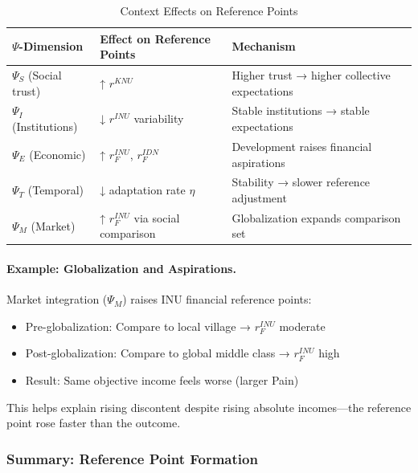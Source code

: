 \begin{table}[htbp]
\centering
\caption{Context Effects on Reference Points}
\label{tab:context-reference}
\renewcommand{\arraystretch}{1.3}
\begin{tabular}{@{}lll@{}}
\toprule
\textbf{$\Psi$-Dimension} & \textbf{Effect on Reference Points} & \textbf{Mechanism} \\
\midrule
$\Psi_S$ (Social trust) & ↑ $r^{KNU}$ & Higher trust → higher collective expectations \\
$\Psi_I$ (Institutions) & ↓ $r^{INU}$ variability & Stable institutions → stable expectations \\
$\Psi_E$ (Economic) & ↑ $r^{INU}_F$, $r^{IDN}_F$ & Development raises financial aspirations \\
$\Psi_T$ (Temporal) & ↓ adaptation rate $\eta$ & Stability → slower reference adjustment \\
$\Psi_M$ (Market) & ↑ $r^{INU}_F$ via social comparison & Globalization expands comparison set \\
\bottomrule
\end{tabular}
\end{table}

\paragraph{Example: Globalization and Aspirations.}
Market integration ($\Psi_M$) raises INU financial reference points:
\begin{itemize}
\item Pre-globalization: Compare to local village → $r^{INU}_F$ moderate
\item Post-globalization: Compare to global middle class → $r^{INU}_F$ high
\item Result: Same objective income feels worse (larger Pain)
\end{itemize}

This helps explain rising discontent despite rising absolute incomes---the 
reference point rose faster than the outcome.

\subsubsection{Summary: Reference Point Formation}

